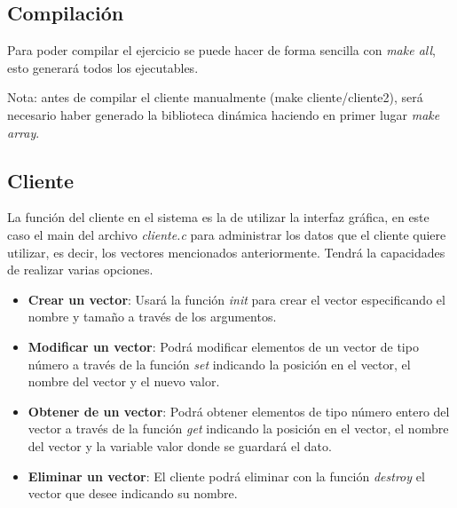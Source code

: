 \documentclass[10pt, spanish, pdftex]{template/UC3M_document}
\begin{document}
\subsection{Compilación}
Para poder compilar el ejercicio se puede hacer de forma sencilla con \textit{make all}, esto generará todos los ejecutables.

Nota: antes de compilar el cliente manualmente (make cliente/cliente2), será necesario haber generado la biblioteca dinámica haciendo en primer lugar \textit{make array}.

\subsection{Cliente}
La función del cliente en el sistema es la de utilizar la interfaz gráfica, en este caso el main del archivo \textit{cliente.c} para administrar los datos que el cliente quiere utilizar, es decir, los vectores mencionados anteriormente. Tendrá la capacidades de realizar varias opciones.

\begin{itemize}
  \item \textbf{Crear un vector}: Usará la función \textit{init} para crear el vector especificando el nombre y tamaño a través de los argumentos.
  \item \textbf{Modificar un vector}: Podrá modificar elementos de un vector de tipo número a través de la función \textit{set} indicando la posición en el vector, el nombre del vector y el nuevo valor.
  \item \textbf{Obtener de un vector}: Podrá obtener elementos de tipo número entero del vector a través de la función \textit{get} indicando la posición en el vector, el nombre del vector y la variable valor donde se guardará el dato.
  \item \textbf{Eliminar un vector}: El cliente podrá eliminar con la función \textit{destroy} el vector que desee indicando su nombre.
\end{itemize}
\end{document}
